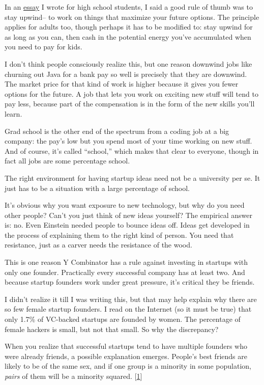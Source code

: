 In an \href{hs.html}{essay} I wrote for high school students, I said a
good rule of thumb was to stay upwind-- to work on things that maximize
your future options. The principle applies for adults too, though
perhaps it has to be modified to: stay upwind for as long as you can,
then cash in the potential energy you've accumulated when you need to
pay for kids.

I don't think people consciously realize this, but one reason downwind
jobs like churning out Java for a bank pay so well is precisely that
they are downwind. The market price for that kind of work is higher
because it gives you fewer options for the future. A job that lets you
work on exciting new stuff will tend to pay less, because part of the
compensation is in the form of the new skills you'll learn.

Grad school is the other end of the spectrum from a coding job at a big
company: the pay's low but you spend most of your time working on new
stuff. And of course, it's called ``school,'' which makes that clear to
everyone, though in fact all jobs are some percentage school.

The right environment for having startup ideas need not be a university
per se. It just has to be a situation with a large percentage of school.

It's obvious why you want exposure to new technology, but why do you
need other people? Can't you just think of new ideas yourself? The
empirical answer is: no. Even Einstein needed people to bounce ideas
off. Ideas get developed in the process of explaining them to the right
kind of person. You need that resistance, just as a carver needs the
resistance of the wood.

This is one reason Y Combinator has a rule against investing in startups
with only one founder. Practically every successful company has at least
two. And because startup founders work under great pressure, it's
critical they be friends.

I didn't realize it till I was writing this, but that may help explain
why there are so few female startup founders. I read on the Internet (so
it must be true) that only 1.7\% of VC-backed startups are founded by
women. The percentage of female hackers is small, but not that small. So
why the discrepancy?

When you realize that successful startups tend to have multiple founders
who were already friends, a possible explanation emerges. People's best
friends are likely to be of the same sex, and if one group is a minority
in some population, \emph{pairs} of them will be a minority squared.
{[}\hyperref[f1n]{1}{]}

